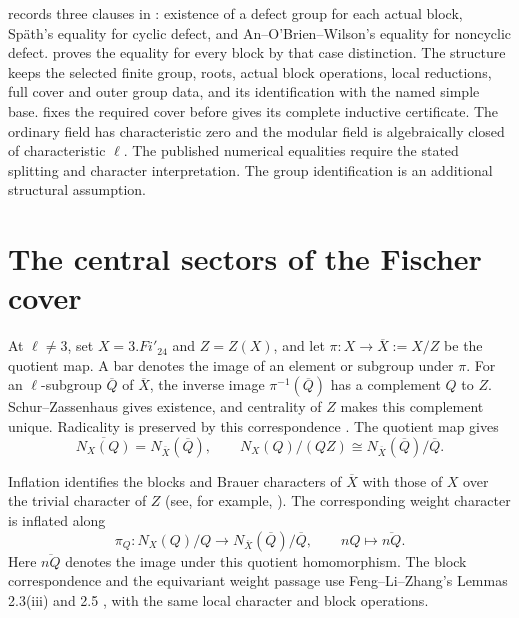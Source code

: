 \begin{implementation}
 records three clauses in
: existence of a defect group for each
actual block, Sp\"ath's equality for cyclic defect, and
An--O'Brien--Wilson's equality for noncyclic defect.
 proves the equality for every
block by that case distinction. The structure 
keeps the selected finite group, roots, actual block operations,
local reductions, full cover and outer group data, and its
identification with the named simple base.
 fixes the required cover before
 gives its complete inductive certificate.
The ordinary field has characteristic zero and the modular field is
algebraically closed of characteristic $\ell$. The published numerical
equalities require the stated splitting and character interpretation.
The group identification is an additional structural assumption.
\end{implementation}

\section{The central sectors of the Fischer cover}

At $\ell\ne3$, set $X=3.Fi'_{24}$ and $Z=Z(X)$, and let
$\pi:X\longrightarrow\overline X:=X/Z$ be the quotient map.
A bar denotes the image of an element or subgroup under $\pi$.
For an $\ell$-subgroup $\overline Q$ of $\overline X$, the inverse
image $\pi^{-1}(\overline Q)$ has a complement $Q$ to $Z$.
Schur--Zassenhaus gives existence, and centrality of $Z$ makes this
complement unique. Radicality is preserved by this correspondence
\cite[Lemma~2.3(c)]{NavarroTiep2011}. The quotient map gives
\[
 \overline{N_X(Q)}=N_{\overline X}(\overline Q),\qquad
 N_X(Q)/(QZ)\cong N_{\overline X}(\overline Q)/\overline Q.
\]

Inflation identifies the blocks and Brauer characters of $\overline X$
with those of $X$ over the trivial character of $Z$
(see, for example, \cite[Theorem~9.9(c)]{Navarro1998}). The corresponding weight
character is inflated along
\[
 \pi_Q:N_X(Q)/Q\longrightarrow
 N_{\overline X}(\overline Q)/\overline Q,\qquad
 nQ\longmapsto\overline{nQ}.
\]
Here $\overline{nQ}$ denotes the image under this quotient homomorphism.
The block correspondence and the equivariant weight passage use
Feng--Li--Zhang's Lemmas 2.3(iii) and 2.5
\cite{FengLiZhang2019}, with the same local character and block
operations.

